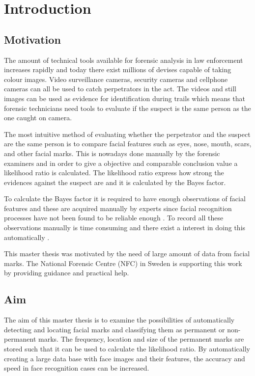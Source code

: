 \section{Introduction}
\subsection{Motivation}
The amount of technical tools available for forensic analysis in law enforcement increases rapidly and today there exist millions of devises capable of taking colour images. Video surveillance cameras, security cameras and cellphone cameras can all be used to catch perpetrators in the act. The videos and still images can be used as evidence for identification during trails which means that forensic technicians need tools to evaluate if the suspect is the same person as the one caught on camera.

The most intuitive method of evaluating whether the perpetrator and the suspect are the same person is to compare facial features such as eyes, nose, mouth, scars, and other facial marks. This is nowadays done manually \cite{face_soft} by the forensic examiners and in order to give a objective and comparable conclusion value a likelihood ratio \cite{NFC_stat} is calculated. The likelihood ratio express how strong the evidences against the suspect are and it is calculated by the Bayes factor.

To calculate the Bayes factor it is required to have enough observations of facial features and these are acquired manually by experts since facial recognition processes have not been found to be reliable enough \cite{automatic_detector_2015}. To record all these observations manually is time consuming and there exist a interest in doing this automatically \cite{forensic_identification}. 

This master thesis was motivated by the need of large amount of data from facial marks. The National Forensic Centre (NFC) in Sweden is supporting this work by providing guidance and practical help.  

\subsection{Aim}

The aim of this master thesis is to examine the possibilities of automatically detecting and locating facial marks and classifying them as permanent or non-permanent marks. The frequency, location and size of the permanent marks are stored such that it can be used to calculate the likelihood ratio. By automatically creating a large data base with face images and their features, the accuracy and speed in face recognition cases can be increased. 

